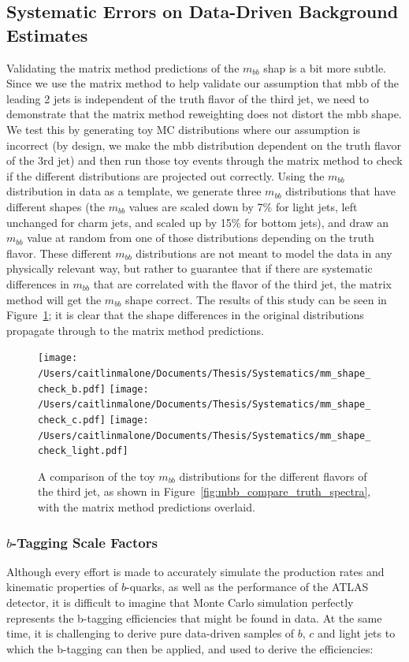 \subsection{Systematic Errors on Data-Driven Background Estimates}
Validating the matrix method predictions of the $m_{bb}$ shap is a bit more subtle. 
Since we use the matrix method to help validate our assumption that mbb of the leading 2 jets is independent of the truth
 flavor of the third jet, we need to demonstrate that the matrix method reweighting does not distort the
 mbb shape. We test this by generating toy MC distributions where our assumption is incorrect (by design,
 we make the mbb distribution dependent on the truth flavor of the 3rd jet) and then run those toy events
 through the matrix method to check if the different distributions are projected out correctly.
 Using the $m_{bb}$ distribution in data as a template, we generate three $m_{bb}$ distributions that have different
 shapes (the $m_{bb}$ values are scaled down by 7\% for light jets, left unchanged for charm jets, and scaled
 up by 15\% for bottom jets), and draw an $m_{bb}$ value at random from one of those distributions depending
 on the truth flavor. These different $m_{bb}$ distributions are not meant to model the data in any physically
 relevant way, but rather to guarantee that if there are systematic differences in $m_{bb}$ that are correlated
 with the flavor of the third jet, the matrix method will get the $m_{bb}$ shape correct.
 The results of this study can be seen in Figure~\ref{fig:mbb_compare_truth_mm_toy}; it is clear that the 
shape differences in the original distributions propagate through to the matrix method predictions.



\begin{figure}
    \centering
    \texttt{[image: /Users/caitlinmalone/Documents/Thesis/Systematics/mm\_shape\_check\_b.pdf]}
    \texttt{[image: /Users/caitlinmalone/Documents/Thesis/Systematics/mm\_shape\_check\_c.pdf]}
    \texttt{[image: /Users/caitlinmalone/Documents/Thesis/Systematics/mm\_shape\_check\_light.pdf]}
    \caption{A comparison of the toy $m_{bb}$ distributions for the different flavors of the
        third jet, as shown in Figure~\ref{fig:mbb_compare_truth_spectra}, with the matrix
        method predictions overlaid.  }
    \label{fig:mbb_compare_truth_mm_toy}
\end{figure}


\subsubsection{$b$-Tagging Scale Factors}
\label{sec:SF}
Although every effort is made to accurately simulate the production rates and
kinematic properties of $b$-quarks, as well as the performance of the ATLAS
detector, it is difficult to imagine that Monte Carlo simulation perfectly represents
the b-tagging efficiencies that might be found in data.  At the same time, it
is challenging to derive pure data-driven samples of $b$, $c$ and light jets to which
the b-tagging can then be applied, and used to derive the efficiencies:

